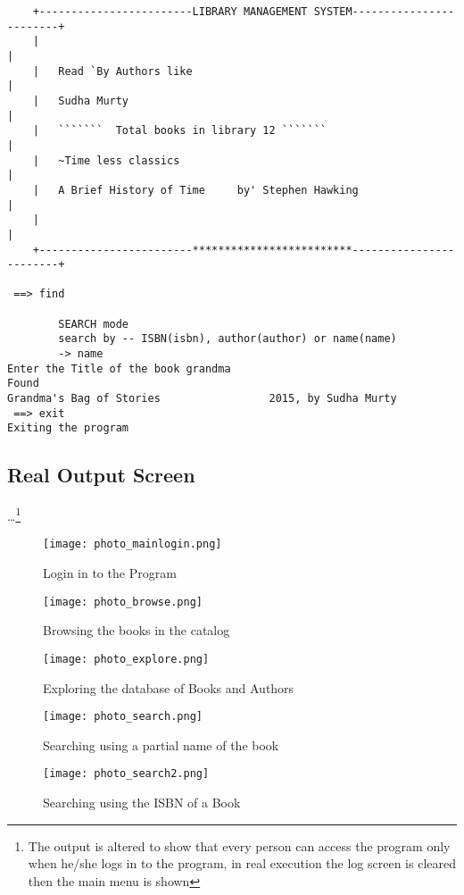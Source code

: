\documentclass[12pt, a4paper, titlepage, openany]{report}
\begin{document}
{\begin{verbatim}
    +------------------------LIBRARY MANAGEMENT SYSTEM------------------------+
    |                                                                         |
    |   Read `By Authors like                                                 |    
    |   Sudha Murty                                                           |                          
    |   ```````  Total books in library 12 ```````                            |
    |   ~Time less classics                                                   |
    |   A Brief History of Time     by' Stephen Hawking                       |
    |                                                                         |
    +------------------------*************************------------------------+
        
 ==> find

        SEARCH mode
        search by -- ISBN(isbn), author(author) or name(name)
        -> name
Enter the Title of the book grandma
Found
Grandma's Bag of Stories                 2015, by Sudha Murty
 ==> exit
Exiting the program

\end{verbatim}
}
\subsection{Real Output Screen}
\ldots\footnote{The output is altered to show that every person can access the program only when he/she logs in to the program, in real execution the log screen is cleared then the main menu is shown}
\begin{figure}
\centering
\texttt{[image: photo\_mainlogin.png]}
\caption{Login in to the Program}
\end{figure}

\begin{figure}
\centering
\texttt{[image: photo\_browse.png]}
\caption{Browsing the books in the catalog}
\end{figure}

\begin{figure}
\centering
\texttt{[image: photo\_explore.png]}
\caption{Exploring the database of Books and Authors}
\end{figure}

\begin{figure}
\centering
\texttt{[image: photo\_search.png]}
\caption{Searching using a partial name of the book}
\end{figure}

\begin{figure}
\centering
\texttt{[image: photo\_search2.png]}
\caption{Searching using the ISBN of a Book}
\end{figure}
\end{document}

